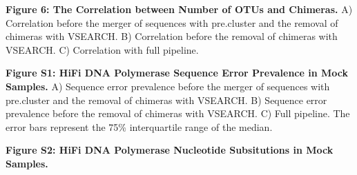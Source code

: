 \documentclass[12pt,]{article}
\begin{document}
\textbf{Figure 6: The Correlation between Number of OTUs and Chimeras.}
A) Correlation before the merger of sequences with pre.cluster and the
removal of chimeras with VSEARCH. B) Correlation before the removal of
chimeras with VSEARCH. C) Correlation with full pipeline.

\newpage

\textbf{Figure S1: HiFi DNA Polymerase Sequence Error Prevalence in Mock
Samples.} A) Sequence error prevalence before the merger of sequences
with pre.cluster and the removal of chimeras with VSEARCH. B) Sequence
error prevalence before the removal of chimeras with VSEARCH. C) Full
pipeline. The error bars represent the 75\% interquartile range of the
median.

\textbf{Figure S2: HiFi DNA Polymerase Nucleotide Subsitutions in Mock
Samples.}
\end{document}
